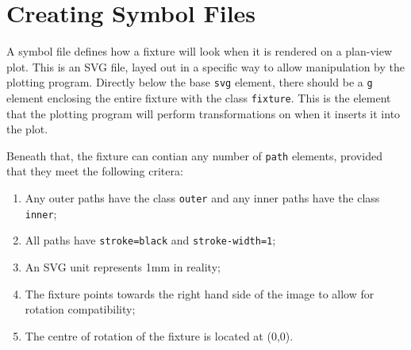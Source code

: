 \documentclass[a4paper]{article}
\begin{document}
\section{Creating Symbol Files}
A symbol file defines how a fixture will look when it is rendered on a 
plan-view plot. This is an SVG file, layed out in a specific way to allow 
manipulation by the plotting program. Directly below the base \texttt{svg} 
element, there should be a \texttt{g} element enclosing the entire fixture 
with the class \texttt{fixture}. This is the element that the plotting 
program will perform transformations on when it inserts it into the plot. 

Beneath that, the fixture can contian any number of \texttt{path} elements, 
provided that they meet the following critera:
\begin{enumerate}
\item Any outer paths have the class \texttt{outer} and any inner paths have 
the class \texttt{inner};
\item All paths have \texttt{stroke=black} and \texttt{stroke-width=1};
\item An SVG unit represents 1mm in reality;
\item The fixture points towards the right hand side of the image to allow for 
rotation compatibility;
\item The centre of rotation of the fixture is located at (0,0).
\end{enumerate}
\end{document}
